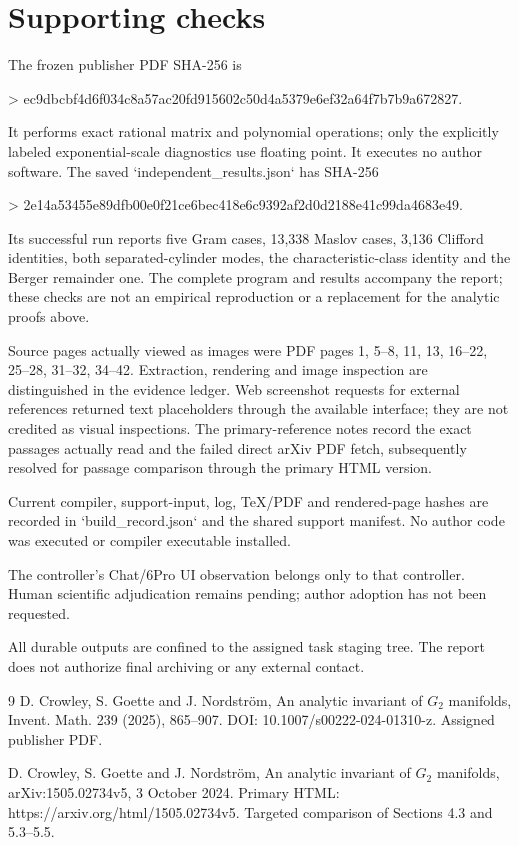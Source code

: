 \documentclass[10pt]{article}
\begin{document}
\section*{Supporting checks}
The frozen publisher PDF SHA-256 is\par
> ec9dbcbf4d6f034c8a57ac20fd915602c50d4a5379e6ef32a64f7b7b9a672827.\par
It performs exact rational matrix and polynomial operations; only the explicitly labeled exponential-scale diagnostics use floating point. It executes no author software. The saved `independent\_results.json` has SHA-256\par
> 2e14a53455e89dfb00e0f21ce6bec418e6c9392af2d0d2188e41c99da4683e49.\par
Its successful run reports five Gram cases, 13,338 Maslov cases, 3,136 Clifford identities, both separated-cylinder modes, the characteristic-class identity and the Berger remainder one. The complete program and results accompany the report; these checks are not an empirical reproduction or a replacement for the analytic proofs above.\par
Source pages actually viewed as images were PDF pages 1, 5–8, 11, 13, 16–22, 25–28, 31–32, 34–42. Extraction, rendering and image inspection are distinguished in the evidence ledger. Web screenshot requests for external references returned text placeholders through the available interface; they are not credited as visual inspections. The primary-reference notes record the exact passages actually read and the failed direct arXiv PDF fetch, subsequently resolved for passage comparison through the primary HTML version.\par
Current compiler, support-input, log, TeX/PDF and rendered-page hashes are recorded in `build\_record.json` and the shared support manifest. No author code was executed or compiler executable installed.\par
The controller’s Chat/6Pro UI observation belongs only to that controller. Human scientific adjudication remains pending; author adoption has not been requested.\par
All durable outputs are confined to the assigned task staging tree. The report does not authorize final archiving or any external contact.\par
9 D. Crowley, S. Goette and J. Nordström, An analytic invariant of \(G_2\) manifolds, Invent. Math. 239 (2025), 865–907. DOI: 10.1007/s00222-024-01310-z. Assigned publisher PDF.\par
D. Crowley, S. Goette and J. Nordström, An analytic invariant of \(G_2\) manifolds, arXiv:1505.02734v5, 3 October 2024. Primary HTML: https://arxiv.org/html/1505.02734v5. Targeted comparison of Sections 4.3 and 5.3–5.5.\par
\end{document}

